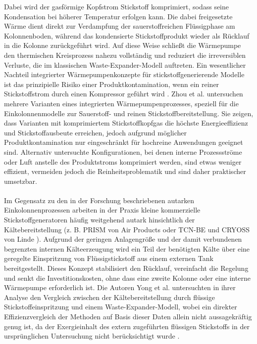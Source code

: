 Dabei wird der gasförmige Kopfstrom Stickstoff komprimiert, sodass seine Kondensation bei höherer Temperatur erfolgen kann. Die dabei freigesetzte Wärme dient direkt zur Verdampfung der sauerstoffreichen Flüssigphase am Kolonnenboden, während das kondensierte Stickstoffprodukt wieder als Rücklauf in die Kolonne zurückgeführt wird. Auf diese Weise schließt die Wärmepumpe den thermischen Kreisprozess nahezu vollständig und reduziert die irreversiblen Verluste, die im klassischen Waste-Expander-Modell auftreten. Ein wesentlicher Nachteil integrierter Wärmepumpenkonzepte für stickstoffgenerierende Modelle ist das prinzipielle Risiko einer Produktkontamination, wenn ein reiner Stickstoffstrom durch einen Kompressor geführt wird \cite{agrawalProductionMediumPressure1991}. Zhou et al. \cite{zhouProcessConfigurationsSimulations2012} untersuchen mehrere Varianten eines integrierten Wärmepumpenprozesses, speziell für die Einkolonnenmodelle zur Sauerstoff- und reinen Stickstoffbereitstellung. Sie zeigen, dass Varianten mit komprimiertem Stickstoffkopfgas die höchste Energieeffizienz und Stickstoffausbeute erreichen, jedoch aufgrund möglicher Produktkontamination nur eingeschränkt für hochreine Anwendungen geeignet sind. Alternativ untersuchte Konfigurationen, bei denen interne Prozessströme oder Luft anstelle des Produktstroms komprimiert werden, sind etwas weniger effizient, vermeiden jedoch die Reinheitsproblematik und sind daher praktischer umsetzbar.\\
\\
Im Gegensatz zu den in der Forschung beschriebenen autarken Einkolonnenprozessen arbeiten in der Praxis kleine kommerzielle Stickstoffgeneratoren häufig weitgehend autark hinsichtlich der Kältebereitstellung (z. B. PRISM von Air Products \cite{airproducts_prism_2013} oder TCN-BE und CRYOSS von Linde \cite{linde_handbook_2011, Linde2003CryossEcovar}). Aufgrund der geringen Anlagengröße und der damit verbundenen begrenzten internen Kälteerzeugung wird ein Teil der benötigten Kälte über eine geregelte Einspritzung von Flüssigstickstoff aus einem externen Tank bereitgestellt. Dieses Konzept stabilisiert den Rücklauf, vereinfacht die Regelung und senkt die Investitionskosten, ohne dass eine zweite Kolonne oder eine interne Wärmepumpe erforderlich ist. Die Autoren Yong et al. \cite{yi2002exergy} untersuchten in ihrer Analyse den Vergleich zwischen der Kältebereitstellung durch flüssige Stickstoffeinspritzung und einem Waste-Expander-Modell, wobei ein direkter Effizienzvergleich der Methoden auf Basis dieser Daten allein nicht aussagekräftig genug ist, da der Exergieinhalt des extern zugeführten flüssigen Stickstoffs in der ursprünglichen Untersuchung nicht berücksichtigt wurde \cite{van_der_ham_exergy_2010}. 

